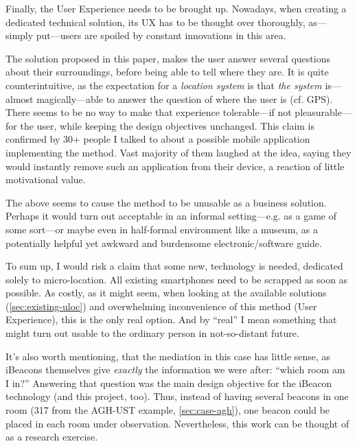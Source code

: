 Finally, the User Experience needs to be brought up. Nowadays, when creating a dedicated technical solution, its UX has to be thought over thoroughly, as---simply put---users are spoiled by constant innovations in this area.

The solution proposed in this paper, makes the user answer several questions about their surroundings, before being able to tell where they are. It is quite counterintuitive, as the expectation for a \emph{location system} is that \emph{the system} is---almost magically---able to answer the question of where the user is (cf. GPS). There seems to be no way to make that experience tolerable---if not pleasurable---for the user, while keeping the design objectives unchanged. This claim is confirmed by 30+ people I talked to about a possible mobile application implementing the method. Vast majority of them laughed at the idea, saying they would instantly remove such an application from their device, a reaction of little motivational value.

The above seems to cause the method to be unusable as a business solution. Perhaps it would turn out acceptable in an informal setting---e.g. as a game of some sort---or maybe even in half-formal environment like a museum, as a potentially helpful yet awkward and burdensome electronic/software guide.

To sum up, I would risk a claim that some new, technology is needed, dedicated solely to micro-location. All existing smartphones need to be scrapped as soon as possible. As costly, as it might seem, when looking at the available solutions (\cref{sec:existing-uloc}) and overwhelming inconvenience of this method (User Experience), this is the only real option. And by ``real'' I mean something that might turn out usable to the ordinary person in not-so-distant future.

It's also worth mentioning, that the mediation in this case has little sense, as iBeacons themselves give \emph{exactly} the information we were after: ``which room am I in?'' Answering that question was the main design objective for the iBeacon technology (and this project, too). Thus, instead of having several beacons in one room (317 from the AGH-UST example, \cref{sec:case-agh}), one beacon could be placed in each room under observation. Nevertheless, this work can be thought of as a research exercise.

